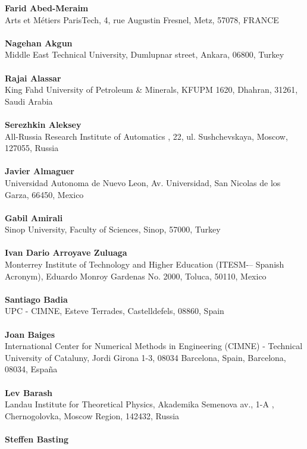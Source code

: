 \noindent
\textbf{Farid Abed-Meraim}
\\ 
Arts et M\'etiers ParisTech, 4, rue Augustin Fresnel, Metz, 57078, FRANCE\\ 
\\ 
\textbf{Nagehan Akgun}
\\ 
Middle East Technical University, Dumlupnar street, Ankara, 06800, Turkey\\ 
\\ 
\textbf{Rajai Alassar}
\\ 
King Fahd University of Petroleum \& Minerals, KFUPM 1620, Dhahran, 31261, Saudi Arabia\\ 
\\ 
\textbf{Serezhkin Aleksey}
\\ 
All-Russia Research Institute of Automatics , 22, ul. Sushchevskaya, Moscow, 127055, Russia\\ 
\\ 
\textbf{Javier Almaguer}
\\ 
Universidad Autonoma de Nuevo Leon, Av. Universidad, San Nicolas de los Garza, 66450, Mexico\\ 
\\ 
\textbf{Gabil Amirali}
\\ 
Sinop University, Faculty of Sciences, Sinop, 57000, Turkey\\ 
\\ 
\textbf{Ivan Dario Arroyave Zuluaga}
\\ 
Monterrey Institute of Technology and Higher Education (ITESM-– Spanish Acronym), Eduardo Monroy Gardenas No. 2000, Toluca, 50110, Mexico\\ 
\\ 
\textbf{Santiago Badia}
\\ 
UPC - CIMNE, Esteve Terrades, Castelldefels, 08860, Spain\\ 
\\ 
\textbf{Joan Baiges}
\\ 
International Center for Numerical Methods in Engineering (CIMNE) - Technical University of Cataluny, Jordi Girona 1-3, 08034 Barcelona, Spain, Barcelona, 08034, Espa\~na\\ 
\\ 
\textbf{Lev Barash}
\\ 
Landau Institute for Theoretical Physics, Akademika Semenova av., 1-A , Chernogolovka, Moscow Region, 142432, Russia\\ 
\\ 
\textbf{Steffen Basting}
\\ 
